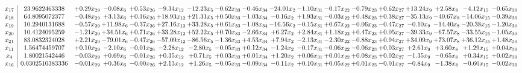 \documentclass[9pt]{article}
\begin{document}
 \[\begin{array}{c| c c@{\hskip 2pt} c@{\hskip 2pt} c@{\hskip 2pt} c@{\hskip 2pt} c@{\hskip 2pt} c@{\hskip 2pt} c@{\hskip 2pt} c@{\hskip 2pt} c@{\hskip 2pt} c@{\hskip 2pt} c@{\hskip 2pt} c@{\hskip 2pt} c@{\hskip 2pt} c@{\hskip 2pt} c@{\hskip 2pt} c@{\hskip 2pt} }
 x_{17}   &  23.9622463338 & +  0.29 x_{29} & -0.08 x_{6} & +  0.53 x_{26} & -9.34 x_{12} & -12.23 x_{5} & -0.62 x_{33} & -0.46 x_{34} & -24.01 x_{2} & -1.10 x_{31} & -0.17 x_{22} & -0.79 x_{23} & +  0.62 x_{27} & + 13.24 x_{9} & +  2.58 x_{8} & -4.12 x_{15} & -0.65 x_{30}\\
 x_{18}   &  64.8095072377 & -0.48 x_{29} & +  3.13 x_{6} & +  0.16 x_{26} & + 18.93 x_{12} & + 21.31 x_{5} & +  0.50 x_{33} & -1.03 x_{34} & -0.16 x_{2} & +  1.93 x_{31} & -0.03 x_{22} & +  0.48 x_{23} & +  0.38 x_{27} & -35.13 x_{9} & -40.67 x_{8} & -14.06 x_{15} & -0.39 x_{30}\\
 x_{19}   &  10.2940131688 & -0.57 x_{29} & + 11.98 x_{6} & -0.37 x_{26} & + 27.16 x_{12} & + 33.28 x_{5} & +  0.61 x_{33} & -1.08 x_{34} & -16.56 x_{2} & -0.15 x_{31} & +  0.67 x_{22} & -0.06 x_{23} & -0.47 x_{27} & -0.10 x_{9} & -14.40 x_{8} & -20.38 x_{15} & -1.20 x_{30}\\
 x_{20}   &  10.4124095259 & -1.21 x_{29} & + 34.51 x_{6} & +  0.71 x_{26} & + 33.28 x_{12} & + 52.22 x_{5} & +  0.70 x_{33} & -2.66 x_{34} & +  6.27 x_{2} & +  2.84 x_{31} & +  1.18 x_{22} & +  0.47 x_{23} & +  0.05 x_{27} & -39.33 x_{9} & -67.57 x_{8} & -33.55 x_{15} & -1.05 x_{30}\\
 x_{21}   &  83.0832324028 & +  2.21 x_{29} & -79.01 x_{6} & -0.47 x_{26} & -57.09 x_{12} & -86.56 x_{5} & -1.36 x_{33} & +  4.53 x_{34} & +  7.94 x_{2} & -2.13 x_{31} & -2.30 x_{22} & -0.88 x_{23} & +  0.94 x_{27} & + 34.09 x_{9} & + 73.07 x_{8} & + 36.12 x_{15} & +  1.48 x_{30}\\
 x_{11}   &  1.56474459707 & +  0.10 x_{29} & -2.10 x_{6} & -0.01 x_{26} & -2.28 x_{12} & -2.80 x_{5} & -0.05 x_{33} & +  0.12 x_{34} & -1.24 x_{2} & -0.17 x_{31} & -0.06 x_{22} & -0.06 x_{23} & +  0.03 x_{27} & +  2.61 x_{9} & +  3.60 x_{8} & +  1.29 x_{15} & +  0.04 x_{30}\\
 x_{4}   &  1.80021542446 & -0.03 x_{29} & +  0.69 x_{6} & -0.01 x_{26} & +  0.35 x_{12} & +  0.71 x_{5} & +  0.03 x_{33} & +  0.01 x_{34} & +  1.20 x_{2} & +  0.06 x_{31} & +  0.01 x_{22} & +  0.08 x_{23} & +  0.02 x_{27} & -1.35 x_{9} & -0.65 x_{8} & +  0.34 x_{15} & +  0.02 x_{30}\\
 x_{16}   &  0.0302510383336 & -0.01 x_{29} & +  0.36 x_{6} & -0.00 x_{26} & +  2.13 x_{12} & +  1.26 x_{5} & -0.05 x_{33} & -0.09 x_{34} & -0.11 x_{2} & +  0.10 x_{31} & +  0.05 x_{22} & +  0.01 x_{23} & -0.01 x_{27} & -0.84 x_{9} & -1.38 x_{8} & -0.60 x_{15} & -0.02 x_{30}\\

\end{array}\]
\end{document}
